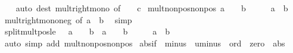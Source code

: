 \begin{isabellebody}
\ \ %
\endisadelimproof
%
\isatagproof
{}\isamarkupfalse%
\ {\isacharparenleft}{\kern0pt}auto\ dest{\isacharcolon}{\kern0pt}\ mult{\isacharunderscore}{\kern0pt}right{\isacharunderscore}{\kern0pt}mono\ {\isacharbrackleft}{\kern0pt}of\ {\isacharunderscore}{\kern0pt}\ {\isacharunderscore}{\kern0pt}\ {\isachardoublequoteopen}{\isacharminus}{\kern0pt}\ c{\isachardoublequoteclose}{\isacharbrackright}{\kern0pt}{\isacharparenright}{\kern0pt}%
\endisatagproof
{\isafoldproof}%
%
\isadelimproof
\isanewline
%
\endisadelimproof
\isanewline
{}\isamarkupfalse%
\ mult{\isacharunderscore}{\kern0pt}nonpos{\isacharunderscore}{\kern0pt}nonpos{\isacharcolon}{\kern0pt}\ {\isachardoublequoteopen}a\ {\isasymle}\ {}\ {\isasymLongrightarrow}\ b\ {\isasymle}\ {}\ {\isasymLongrightarrow}\ {}\ {\isasymle}\ a\ {\isacharasterisk}{\kern0pt}\ b{\isachardoublequoteclose}\isanewline
%
\isadelimproof
\ \ %
\endisadelimproof
%
\isatagproof
{}\isamarkupfalse%
\ mult{\isacharunderscore}{\kern0pt}right{\isacharunderscore}{\kern0pt}mono{\isacharunderscore}{\kern0pt}neg\ {\isacharbrackleft}{\kern0pt}of\ a\ {}\ b{\isacharbrackright}{\kern0pt}\ \isamarkupfalse%
\ simp%
\endisatagproof
{\isafoldproof}%
%
\isadelimproof
\isanewline
%
\endisadelimproof
\isanewline
{}\isamarkupfalse%
\ split{\isacharunderscore}{\kern0pt}mult{\isacharunderscore}{\kern0pt}pos{\isacharunderscore}{\kern0pt}le{\isacharcolon}{\kern0pt}\ {\isachardoublequoteopen}{\isacharparenleft}{\kern0pt}{}\ {\isasymle}\ a\ {\isasymand}\ {}\ {\isasymle}\ b{\isacharparenright}{\kern0pt}\ {\isasymor}\ {\isacharparenleft}{\kern0pt}a\ {\isasymle}\ {}\ {\isasymand}\ b\ {\isasymle}\ {}{\isacharparenright}{\kern0pt}\ {\isasymLongrightarrow}\ {}\ {\isasymle}\ a\ {\isacharasterisk}{\kern0pt}\ b{\isachardoublequoteclose}\isanewline
%
\isadelimproof
\ \ %
\endisadelimproof
%
\isatagproof
{}\isamarkupfalse%
\ {\isacharparenleft}{\kern0pt}auto\ simp\ add{\isacharcolon}{\kern0pt}\ mult{\isacharunderscore}{\kern0pt}nonpos{\isacharunderscore}{\kern0pt}nonpos{\isacharparenright}{\kern0pt}%
\endisatagproof
{\isafoldproof}%
%
\isadelimproof
\isanewline
%
\endisadelimproof
\isanewline
{}\isamarkupfalse%
\isanewline
\isanewline
{}\isamarkupfalse%
\ abs{\isacharunderscore}{\kern0pt}if\ {\isacharequal}{\kern0pt}\ minus\ {\isacharplus}{\kern0pt}\ uminus\ {\isacharplus}{\kern0pt}\ ord\ {\isacharplus}{\kern0pt}\ zero\ {\isacharplus}{\kern0pt}\ abs\ {\isacharplus}{\kern0pt}\isanewline

\end{isabellebody}
